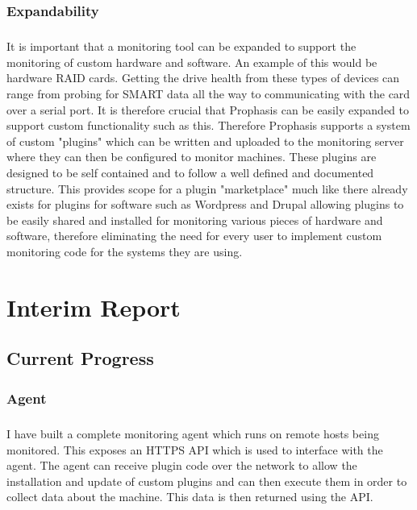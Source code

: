 \documentclass[bsc,logo,twoside]{infthesis}
\begin{document}
\subsection{Expandability}
\paragraph*{}
	It is important that a monitoring tool can be expanded to support the
	monitoring of custom hardware and software.  An example of this would be
	hardware RAID cards.  Getting the drive health from these types of devices
	can range from probing for SMART data all the way to communicating with the
	card over a serial port.  It is therefore crucial that Prophasis can be
	easily expanded to support custom functionality such as this. Therefore 
	Prophasis supports a system of custom "plugins" which can be written and
	uploaded to the monitoring server where they can then be configured to monitor
	machines. These plugins are designed to be self contained and to follow a well
	defined and documented structure.  This provides scope for a plugin
	"marketplace" much like there already exists for plugins for software such as
	Wordpress and Drupal allowing plugins to be easily shared and installed for
	monitoring various pieces of hardware and software, therefore eliminating the
	need for every user to implement custom monitoring code for the systems they
	are using.
	
\chapter{Interim Report}
\section{Current Progress}
\subsection{Agent}
\paragraph*{}
	I have built a complete monitoring agent which runs on remote hosts being
	monitored. This exposes an HTTPS API which is used to interface with the
	agent.  The agent can receive plugin code over the network to allow the
	installation and update of custom plugins and can then execute them in order
	to collect data about the machine.  This data is then returned using the API.
	
\end{document}
